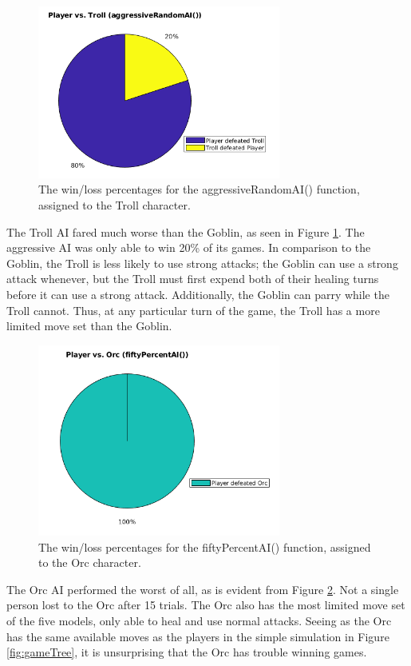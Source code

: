 \begin{figure}[H]
  \centering
  \includegraphics[width=8cm]{figures/trollWins.png}
  \caption{The win/loss percentages for the aggressiveRandomAI() function, assigned to the Troll character.}
  \label{fig:pieTroll}
\end{figure}

The Troll AI fared much worse than the Goblin, as seen in Figure \ref{fig:pieTroll}. The aggressive AI was only able to win 20\% of its games. In comparison to the Goblin, the Troll is less likely to use strong attacks; the Goblin can use a strong attack whenever, but the Troll must first expend both of their healing turns before it can use a strong attack. Additionally, the Goblin can parry while the Troll cannot. Thus, at any particular turn of the game, the Troll has a more limited move set than the Goblin.\\

\begin{figure}[H]
  \centering
  \includegraphics[width=8cm]{figures/orcWins.png}
  \caption{The win/loss percentages for the fiftyPercentAI() function, assigned to the Orc character.}
  \label{fig:pieOrc}
\end{figure}

The Orc AI performed the worst of all, as is evident from Figure \ref{fig:pieOrc}. Not a single person lost to the Orc after 15 trials. The Orc also has the most limited move set of the five models, only able to heal and use normal attacks. Seeing as the Orc has the same available moves as the players in the simple simulation in Figure \ref{fig:gameTree}, it is unsurprising that the Orc has trouble winning games.

